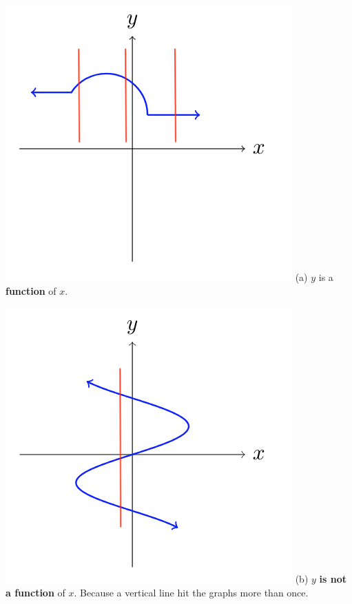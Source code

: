 \noindent\begin{minipage}{0.4\textwidth}%
\includegraphics[width=\linewidth]{Pics/1_line.png}
(a) $y$ is a \textbf{function} of $x$.
\end{minipage}%
\hfill%
\begin{minipage}{0.4\textwidth}
\includegraphics[width=\linewidth]{Pics/2_line.png}
(b) $y$ \textbf{is not a function} of $x$. Because a vertical line hit the graphs more than once.
\end{minipage}
